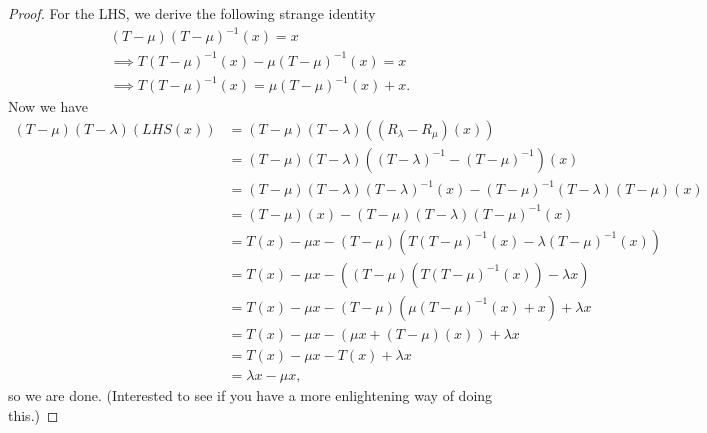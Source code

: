 \documentclass[12pt]{article}
\theoremstyle{definition}
\begin{document}
\begin{proof}
	For the LHS, we derive the following strange identity \begin{align*}
		(T - \mu)(T - \mu)^{-1}(x) = x                          \\
		\implies T(T - \mu)^{-1}(x) - \mu (T - \mu)^{-1}(x) = x \\
		\implies T(T - \mu)^{-1}(x) = \mu (T - \mu)^{-1}(x) + x.
	\end{align*}
	Now we have \begin{align*}
		(T-\mu)(T-\lambda)(LHS(x)) & = (T-\mu)(T-\lambda)((R_\lambda - R_\mu)(x))                                  \\
		                           & = (T-\mu)(T-\lambda)((T-\lambda)^{-1} - (T - \mu)^{-1})(x)                    \\
		                           & = (T-\mu)(T-\lambda)(T-\lambda)^{-1}(x) - (T-\mu)^{-1}(T-\lambda)(T - \mu)(x) \\
		                           & = (T-\mu)(x) - (T-\mu)(T-\lambda)(T - \mu)^{-1}(x)                            \\
		                           & = T(x) - \mu x - (T-\mu)(T(T - \mu)^{-1}(x) - \lambda(T-\mu)^{-1}(x))         \\
		                           & = T(x) - \mu x - ((T-\mu)(T(T - \mu)^{-1}(x)) - \lambda x)                    \\
		                           & = T(x) - \mu x - (T-\mu)(\mu(T-\mu)^{-1}(x) + x) + \lambda x                  \\
		                           & = T(x) - \mu x - (\mu x + (T-\mu)(x)) + \lambda x                             \\
		                           & = T(x) - \mu x - T(x) + \lambda x                                             \\
		                           & = \lambda x - \mu x,
	\end{align*}
	so we are done.
	(Interested to see if you have a more enlightening way of doing this.)
\end{proof}
\end{document}
